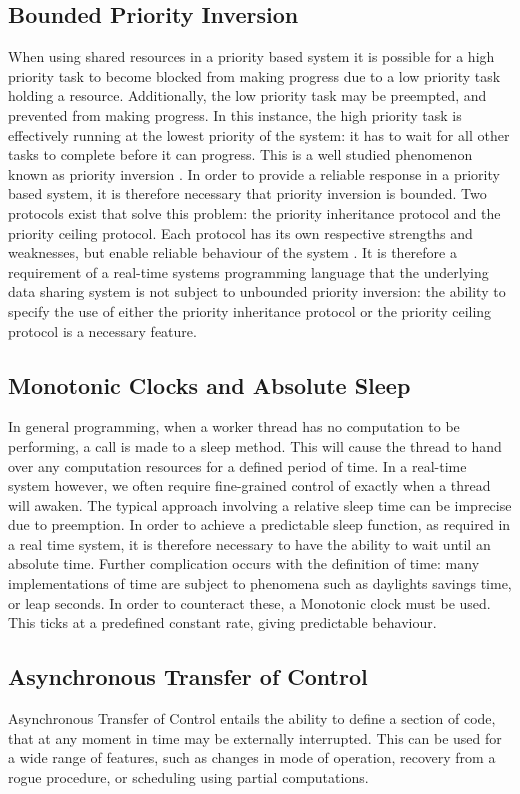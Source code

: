 \subsection{Bounded Priority Inversion}
When using shared resources in a priority based system it is possible for 
a high priority task to become blocked from making progress due to a low
priority task holding a resource. Additionally, the low priority task may be 
preempted, and prevented from making progress. In this instance, the high priority task is 
effectively running at the lowest priority of the system: it has to wait for all other 
tasks to complete before it can progress. This is a well studied phenomenon known 
as priority inversion 
\cite{Burns and Welling page..}. 
In order to provide a reliable response in a priority based system, it is 
therefore necessary that priority inversion is bounded.
Two protocols exist that solve this problem: the priority inheritance protocol 
and the priority ceiling protocol. Each protocol has its own respective 
strengths and weaknesses, but enable reliable behaviour of the system 
\cite{books.google.co.uk/books?id=coPT7vaEjFsC&pg=PA87}.
It is therefore a requirement of a real-time systems programming language 
that the underlying data sharing system is not subject to unbounded priority 
inversion: the ability to specify the use of either the priority inheritance 
protocol or the priority ceiling protocol is a necessary feature.  

\subsection{Monotonic Clocks and Absolute Sleep}
In general programming, when a worker thread has no computation to be 
performing, a call is made to a sleep method. This will cause the thread
to hand over any computation resources for a defined period of time. In a 
real-time system however, we often require fine-grained control of exactly
when a thread will awaken. The typical approach involving a relative sleep 
time can be imprecise due to preemption. In order to achieve a predictable 
sleep function, as required in a real time system, it is therefore necessary 
to have the ability to wait until an absolute time. Further complication 
occurs with the definition of time: many implementations of time are subject 
to phenomena such as daylights savings time, or leap seconds. 
In order to counteract these, a Monotonic clock must be used. This ticks at a 
predefined constant rate, giving predictable behaviour. 

\subsection{Asynchronous Transfer of Control}
Asynchronous Transfer of Control entails the ability to define a section of code, 
that at any moment in time may be externally interrupted. This can be used for a 
wide range of features, such as changes in mode of operation, recovery from a 
rogue procedure, or scheduling using partial computations.
